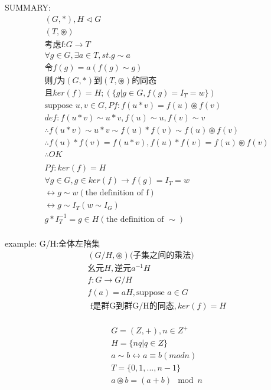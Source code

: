 \documentclass[12pt, a4paper]{article}  %
\begin{document}
SUMMARY:
\begin{align}
    &(G,*),H\triangleleft G\\
    &(T,\circledast)\\
    &\text{考虑f:}G\rightarrow T\\
    & \forall g\in G,\exists a\in T,st. g\sim a\\
    &\text{令}f(g)=a(f(g)\sim g)\\
    &\text{则}f \text{为} (G,*)\text{到}(T,\circledast) \text{的同态}\\
    &\text{且}ker(f)=H;(\{g|g\in G,f(g)=I_T=w\})\\
    &\text{suppose }u,v\in G,Pf:f(u*v)=f(u)\circledast f(v)\\
    &def: f(u*v)\sim u*v,f(u)\sim u,f(v)\sim v\\
    &\therefore f(u*v)\sim u*v\sim f(u)*f(v)\sim f(u)\circledast f(v)\\
    &\therefore f(u)*f(v)=f(u*v),f(u)*f(v)=f(u)\circledast f(v)\\
    &\therefore OK\\
    &\\
    &Pf:ker(f)=H\\
    &\forall g\in G,g\in ker(f)\rightarrow f(g)=I_T=w\\
    &\leftrightarrow g\sim w(\text{the definition of f})\\
    &\leftrightarrow g\sim I_T(w\sim I_G)\\
    &g *I_T^{-1}=g\in H(\text{the definition of \(\sim\)})\\
\end{align}

example: G/H:全体左陪集
\begin{align}
    &(G/H,\circledast)\text{(子集之间的乘法)}\\
    &\text{幺元}H,\text{逆元}a^{-1}H\\
    &f:G\rightarrow G/H\\
    &f(a)=aH,\text{suppose }a\in G\\
    &\text{ f是群G到群G/H的同态},ker(f)=H\\
\end{align}

\begin{align}
    &G=(Z,+),n\in Z^{+}\\
    &H=\{nq|q\in Z\}\\
    &a\sim b\leftrightarrow a\equiv b(mod n)\\
    &T=\{0,1,...,n-1\}\\
    &a\circledast b=(a+b)\mod n\\
\end{align}
\end{document}
